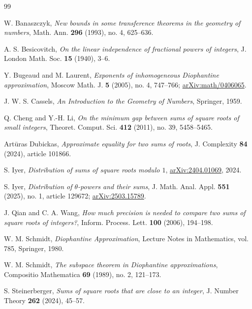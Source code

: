 \documentclass[11pt]{article}
\theoremstyle{remark}
\begin{document}
\begin{thebibliography}{99}

W. Banaszczyk,
\emph{New bounds in some transference theorems in the geometry of numbers},
Math. Ann. \textbf{296} (1993), no. 4, 625--636.

A. S. Besicovitch,
\emph{On the linear independence of fractional powers of integers},
J. London Math. Soc. \textbf{15} (1940), 3--6.

Y. Bugeaud and M. Laurent,
\emph{Exponents of inhomogeneous Diophantine approximation},
Moscow Math. J. \textbf{5} (2005), no. 4, 747--766; \href{https://arxiv.org/abs/math/0406065}{arXiv:math/0406065}.

J. W. S. Cassels,
\emph{An Introduction to the Geometry of Numbers},
Springer, 1959.

Q. Cheng and Y.-H. Li,
\emph{On the minimum gap between sums of square roots of small integers},
Theoret. Comput. Sci. \textbf{412} (2011), no. 39, 5458--5465.

Art\=uras Dubickas,
\emph{Approximate equality for two sums of roots},
J. Complexity \textbf{84} (2024), article 101866.

S. Iyer,
\emph{Distribution of sums of square roots modulo $1$},
\href{https://arxiv.org/abs/2404.01069}{arXiv:2404.01069}, 2024.

S. Iyer,
\emph{Distribution of $\theta$-powers and their sums},
J. Math. Anal. Appl. \textbf{551} (2025), no. 1, article 129672;
\href{https://arxiv.org/abs/2503.15789}{arXiv:2503.15789}.

J. Qian and C. A. Wang,
\emph{How much precision is needed to compare two sums of square roots of integers?},
Inform. Process. Lett. \textbf{100} (2006), 194--198.

W. M. Schmidt,
\emph{Diophantine Approximation},
Lecture Notes in Mathematics, vol. 785, Springer, 1980.

W. M. Schmidt,
\emph{The subspace theorem in Diophantine approximations},
Compositio Mathematica \textbf{69} (1989), no. 2, 121--173.

S. Steinerberger,
\emph{Sums of square roots that are close to an integer},
J. Number Theory \textbf{262} (2024), 45--57.


\end{thebibliography}
\end{document}
